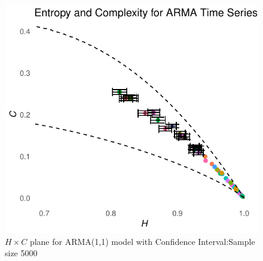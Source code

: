 \documentclass[12pt,a4paper]{article}
\begin{document}
\begin{figure}[H]
	\includegraphics[width=0.8 \textwidth]{HC plane ARMA(11) with CI}
	\caption{$H \times C$ plane for ARMA(1,1) model with Confidence Interval:Sample size 5000}
	\label{fig:HC ARMA(11) CI}
\end{figure}



	
	

	
%	
	
\end{document}
